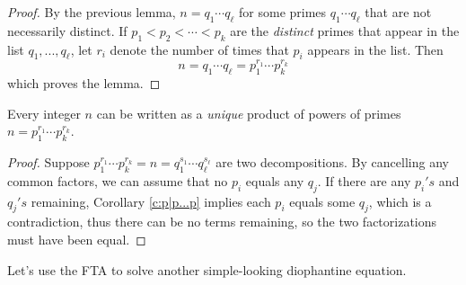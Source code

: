 \documentclass[11pt,dvipsnames]{book}
\numberwithin{equation}{section} %
\numberwithin{figure}{section} %
\numberwithin{table}{section} %
\begin{document}
\begin{proof}
By the previous lemma, $n=q_{1}\cdots q_\ell$ for some primes $q_{1}\cdots q_{\ell}$ that are not necessarily distinct. If $p_{1}<p_{2}<\cdots < p_{k}$ are the {\it distinct} primes that appear in the list $q_{1},...,q_{\ell}$, let $r_{i}$ denote the number of times that $p_{i}$ appears in the list. Then
\[
n=q_{1}\cdots q_{\ell} = p_{1}^{r_{1}}\cdots p_{k}^{r_{k}}\]
which proves the lemma.
\end{proof}



\begin{lemma} Every integer $n$ can be written as a {\it unique} product of powers of primes $n=p_1^{r_{1}}\cdots p_k^{r_{k}}$.
\end{lemma}
  
  \begin{proof}
  Suppose $p_1^{r_{1}}\cdots p_k^{r_{k}} = n = q_1^{s_{1}}\cdots q_\ell^{s_{\ell}}$ are two decompositions. By cancelling any common factors, we can assume that no $p_i$ equals any $q_j$. If there are  any $p_i's$ and $q_j's$ remaining,  Corollary \ref{c:p|p...p} implies each $p_{i}$ equals some $q_j$, which is a contradiction, thus there can be no terms remaining, so the two factorizations must have been equal.
  \end{proof}



Let's use the FTA to solve another simple-looking diophantine equation. 
\end{document}
